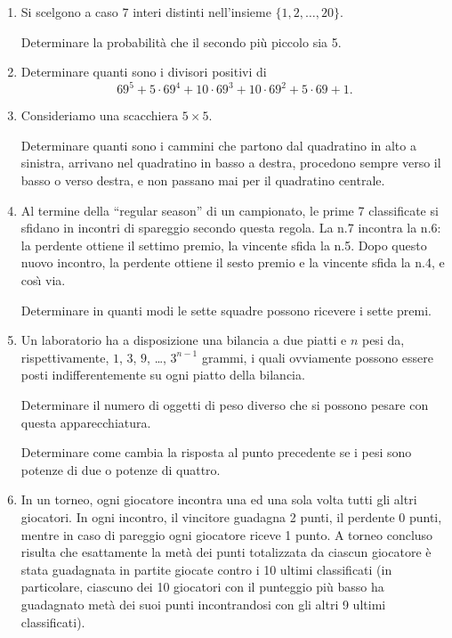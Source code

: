 \documentclass[a4paper,10pt]{article}
\begin{document}
\begin{enumerate}
	\item  Si scelgono a caso 7 interi distinti nell'insieme
	$\{1,2,\ldots,20\}$.

	Determinare la probabilit\`{a} che il secondo pi\`{u} piccolo sia 5.

	\item  Determinare quanti sono i divisori positivi di
	$$69^{5}+5\cdot 69^{4}+10\cdot 69^{3}+10\cdot 69^{2}+
	5\cdot 69+1.$$

	\item  Consideriamo una scacchiera $5\times 5$.

	Determinare quanti sono i cammini che partono dal quadratino in alto
	a sinistra, arrivano nel quadratino in basso a destra, procedono
	sempre verso il basso o verso destra, e non passano mai per il
	quadratino centrale.

	\item  Al termine della ``regular season'' di un campionato, le
	prime 7 classificate si sfidano in incontri di spareggio secondo
	questa regola. La n.7 incontra la n.6: la perdente ottiene il settimo
	premio, la vincente sfida la n.5. Dopo questo nuovo incontro, la
	perdente ottiene il sesto premio e la vincente sfida la n.4, e
	cos\`{\i} via.

	Determinare in quanti modi le sette squadre possono ricevere i sette
	premi.

	\item  Un laboratorio ha a disposizione una bilancia a due piatti e
	$n$ pesi da, rispettivamente, $1$, $3$, $9$, \ldots, $3^{n-1}$
	grammi, i quali ovviamente possono essere posti indifferentemente su
	ogni piatto della bilancia.

	Determinare il numero di oggetti di peso diverso che si possono
	pesare con questa apparecchiatura.

	Determinare come cambia la risposta al punto precedente se i pesi
	sono potenze di due o potenze di quattro.

	\item  In un torneo, ogni giocatore incontra una ed una sola volta
	tutti gli altri giocatori. In ogni incontro, il vincitore guadagna 2
	punti, il perdente 0 punti, mentre in caso di pareggio ogni
	giocatore riceve 1 punto. A torneo concluso risulta che esattamente
	la met\`{a} dei punti totalizzata da ciascun giocatore \`{e} stata
	guadagnata in partite giocate contro i 10 ultimi classificati (in
	particolare, ciascuno dei 10 giocatori con il punteggio pi\`{u} basso
	ha guadagnato met\`{a} dei suoi punti incontrandosi con gli altri 9
	ultimi classificati).


\end{enumerate}
\end{document}
